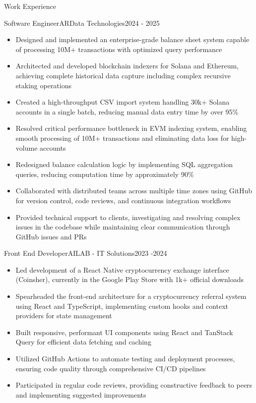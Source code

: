 \documentclass[]{mcdowellcv}
\begin{document}
	\begin{cvsection}{Work Experience}
		\begin{cvsubsection}{Software Engineer}{ARData Technologies}{2024 - 2025}		
			\begin{itemize}
        \item Designed and implemented an enterprise-grade balance sheet system capable of processing 10M+ transactions with optimized query performance
				\item Architected and developed blockchain indexers for Solana and Ethereum, achieving complete historical data capture including complex recursive staking operations
        \item Created a high-throughput CSV import system handling 30k+ Solana accounts in a single batch, reducing manual data entry time by over 95\%
        \item Resolved critical performance bottleneck in EVM indexing system, enabling smooth processing of 10M+ transactions and eliminating data loss for high-volume accounts
        \item Redesigned balance calculation logic by implementing SQL aggregation queries, reducing computation time by approximately 90\%
        \item Collaborated with distributed teams across multiple time zones using GitHub for version control, code reviews, and continuous integration workflows
        \item Provided technical support to clients, investigating and resolving complex issues in the codebase while maintaining clear communication through GitHub issues and PRs
			\end{itemize}
		\end{cvsubsection}
		
		\begin{cvsubsection}{Front End Developer}{AILAB - IT Solutions}{2023 -2024}		
			\begin{itemize}
				\item Led development of a React Native cryptocurrency exchange interface (Coinsher), currently in the Google Play Store with 1k+ official downloads
				\item Spearheaded the front-end architecture for a cryptocurrency referral system using React and TypeScript, implementing custom hooks and context providers for state management
				\item Built responsive, performant UI components using React and TanStack Query for efficient data fetching and caching
				\item Utilized GitHub Actions to automate testing and deployment processes, ensuring code quality through comprehensive CI/CD pipelines
				\item Participated in regular code reviews, providing constructive feedback to peers and implementing suggested improvements
			\end{itemize}
      \clearpage
		\end{cvsubsection}
		

\end{cvsection}
\end{document}
